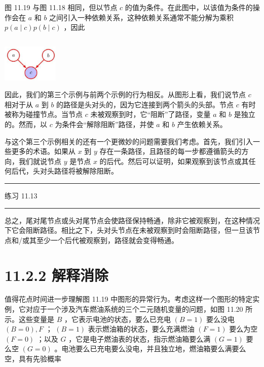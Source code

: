 \documentclass[10pt]{report}
\newcommand{\HRule}{\begin{center}\rule{0.9\linewidth}{0.2mm}\end{center}}
\begin{document}
图 11.19 与图 11.18 相同，但以节点 \(c\) 的值为条件。在此图中，以该值为条件的操作会在 \(a\) 和 \(b\) 之间引入一种依赖关系，这种依赖关系通常不能分解为乘积 \(p\left( {a \mid  c}\right) p\left( {b \mid  c}\right)\) ，因此

\[
\]

\begin{center}
\includegraphics[max width=0.2\textwidth]{images/0194e279-9b28-703a-88f4-c3ac21e2010d_360_1281_344_270_179_0.jpg}
\end{center}
\hspace*{3em} 

因此，我们的第三个示例与前两个示例的行为相反。从图形上看，我们说节点 \(c\) 相对于从 \(a\) 到 \(b\) 的路径是头对头的，因为它连接到两个箭头的头部。节点 \(c\) 有时被称为碰撞节点。当节点 \(c\) 未被观察到时，它“阻断”了路径，变量 \(a\) 和 \(b\) 是独立的。然而，以 \(c\) 为条件会“解除阻断”路径，并使 \(a\) 和 \(b\) 产生依赖关系。

与这个第三个示例相关的还有一个更微妙的问题需要我们考虑。首先，我们引入一些更多的术语。如果从 \(x\) 到 \(y\) 存在一条路径，且路径的每一步都遵循箭头的方向，我们就说节点 \(y\) 是节点 \(x\) 的后代。然后可以证明，如果观察到该节点或其任何后代，头对头路径将被解除阻断。

\HRule

练习 11.13

\HRule

总之，尾对尾节点或头对尾节点会使路径保持畅通，除非它被观察到，在这种情况下它会阻断路径。相比之下，头对头节点在未被观察到时会阻断路径，但一旦该节点和/或其至少一个后代被观察到，路径就会变得畅通。

\section*{11.2.2 解释消除}

值得花点时间进一步理解图 11.19 中图形的异常行为。考虑这样一个图形的特定实例，它对应于一个涉及汽车燃油系统的三个二元随机变量的问题，如图 11.20 所示。这些变量是 \(B\) ，它表示电池的状态，要么已充电 \(\left( {B = 1}\right)\) 要么没电 \(\left( {B = 0}\right) ,F\) ； \(\left( {B = 1}\right)\) 表示燃油箱的状态，要么充满燃油 \(\left( {F = 1}\right)\) 要么为空 \(\left( {F = 0}\right)\) ；以及 \(G\) ，它是电子燃油表的状态，指示燃油箱要么满 \(\left( {G = 1}\right)\) 要么空 \(\left( {G = 0}\right)\) 。电池要么已充电要么没电，并且独立地，燃油箱要么满要么空，具有先验概率
\end{document}
